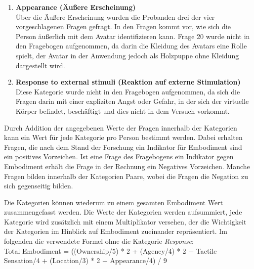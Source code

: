 \begin{enumerate}
\item\textbf{Appearance (Äußere Erscheinung)}\\
Über die Äußere Erscheinung wurden die Probanden drei der vier vorgeschlagenen Fragen gefragt. In den Fragen kommt vor, wie sich die Person äußerlich mit dem Avatar identifizieren kann. Frage 20 wurde nicht in den Fragebogen aufgenommen, da darin die Kleidung des Avatars eine Rolle spielt, der Avatar in der Anwendung jedoch als Holzpuppe ohne Kleidung dargestellt wird.

\item\textbf{Response to external stimuli (Reaktion auf externe Stimulation)}\\
Diese Kategorie wurde nicht in den Fragebogen aufgenommen, da sich die Fragen darin mit einer expliziten Angst oder Gefahr, in der sich der virtuelle Körper befindet, beschäftigt und dies nicht in dem Versuch vorkommt.

\end{enumerate}

Durch Addition der angegebenen Werte der Fragen innerhalb der Kategorien kann ein Wert für jede Kategorie pro Person bestimmt werden. Dabei erhalten Fragen, die nach dem Stand der Forschung ein Indikator für Embodiment sind ein positives Vorzeichen. Ist eine Frage des Fragebogens ein Indikator gegen Embodiment erhält die Frage in der Rechnung ein Negatives Vorzeichen.
Manche Fragen bilden innerhalb der Kategorien Paare, wobei die Fragen die Negation zu sich gegenseitig bilden.

Die Kategorien können wiederum zu einem gesamten Embodiment Wert zusammengefasst werden. Die Werte der Kategorien werden aufsummiert, jede Kategorie wird zusätzlich mit einem Multiplikator versehen, der die Wichtigkeit der Kategorien im Hinblick auf Embodiment  zueinander repräsentiert. Im folgenden die verwendete Formel ohne die Kategorie \textit{Response}:\\
Total Embodiment = ((Ownership/5) * 2 + (Agency/4) * 2 + Tactile Sensation/4 + (Location/3) * 2 + Appearance/4) / 9




